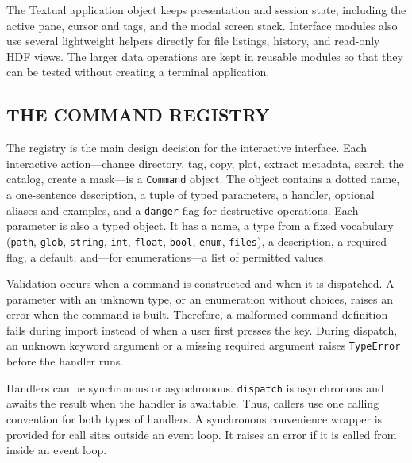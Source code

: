 \documentclass[tm]{ornltm}
\begin{document}
\begin{figure}[ht]
  \centering
  \resizebox{\textwidth}{!}{}
  \label{fig:arch}
\end{figure}

The Textual application object keeps presentation and session state, including
the active pane, cursor and tags, and the modal screen stack. Interface modules
also use several lightweight helpers directly for file listings, history, and
read-only HDF views. The larger data operations are kept in reusable modules so
that they can be tested without creating a terminal application.

\subsection{THE COMMAND REGISTRY}
\label{sec:registry}

The registry is the main design decision for the interactive interface. Each
interactive action---change directory, tag, copy, plot, extract metadata, search
the catalog, create a mask---is a \texttt{Command} object. The object contains a
dotted name, a one-sentence description, a tuple of typed parameters, a handler,
optional aliases and examples, and a \texttt{danger} flag for destructive
operations. Each parameter is also a typed object. It has a name, a type from a
fixed vocabulary (\texttt{path}, \texttt{glob},
\texttt{string}, \texttt{int}, \texttt{float}, \texttt{bool}, \texttt{enum},
\texttt{files}), a description, a required flag, a default, and---for
enumerations---a list of permitted values.

Validation occurs when a command is constructed and when it is dispatched. A
parameter with an unknown type, or an enumeration without choices, raises an
error when the command is built. Therefore, a malformed command definition
fails during import instead of when a user first presses the key. During
dispatch, an unknown keyword argument or a missing required argument raises
\texttt{TypeError} before the handler runs.

Handlers can be synchronous or asynchronous. \texttt{dispatch} is asynchronous
and awaits the result when the handler is awaitable. Thus, callers use one
calling convention for both types of handlers. A synchronous convenience
wrapper is provided for call sites outside an event loop. It raises an error if
it is called from inside an event loop.
\end{document}
